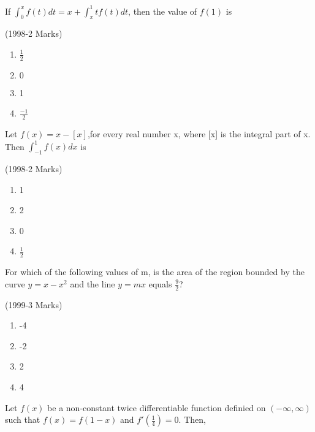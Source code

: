 \iffalse
\title{Definite-Integrals-Applications-Integrals}
\author{AI24BTECH11007 - Desaboina Sri Sathwik}
\section{mcq-multiple}
\fi
	\item
		If $\int_{0}^{x}f(t)dt=x+\int_{x}^{1}tf(t)dt$, then the value of $f(1)$ is 

		\hfill{(1998-2 Marks)}
		\begin{multicols}{4}
		\begin{enumerate}
			\item $\frac{1}{2}$
			\item $0$
			\item 1
			\item $\frac{-1}{2}$
		\end{enumerate}
		\end{multicols}
	\item
		Let $f(x)=x-[x]$,for every real number x, where [x] is the integral part of x. Then $\int_{-1}^{1}f(x)dx$ is 

		\hfill{(1998-2 Marks)}
		\begin{multicols}{4}
		\begin{enumerate}
			\item 1
			\item 2
			\item 0
			\item $\frac{1}{2}$
		\end{enumerate}  
			\end{multicols}
	\item 
		For which of the following values of m, is the area of the region bounded by the curve $y=x-x^2$ and the line $y=mx$ equals $\frac{9}{2}$?

		\hfill{(1999-3 Marks)}
		\begin{multicols}{4}
		\begin{enumerate}
			\item -4
			\item -2
			\item 2
			\item 4
		\end{enumerate}
		\end{multicols}
	\item 
		Let $f(x)$ be a non-constant twice differentiable function definied on $(-\infty,\infty)$ such that $f(x)=f(1-x)$ and $f'(\frac{1}{4})=0$. Then,

